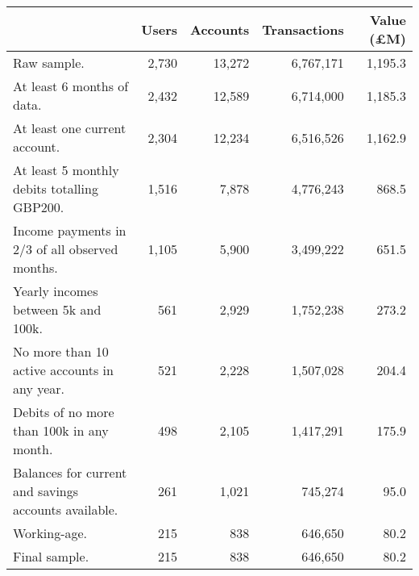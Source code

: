 \begin{tabular}{lrrrr}
\toprule
                                                     & Users & Accounts & Transactions & Value (\pounds M) \\
\midrule
                                         Raw sample. & 2,730 &   13,272 &    6,767,171 &           1,195.3 \\
                          At least 6 months of data. & 2,432 &   12,589 &    6,714,000 &           1,185.3 \\
                       At least one current account. & 2,304 &   12,234 &    6,516,526 &           1,162.9 \\
         At least 5 monthly debits totalling GBP200. & 1,516 &    7,878 &    4,776,243 &             868.5 \\
      Income payments in 2/3 of all observed months. & 1,105 &    5,900 &    3,499,222 &             651.5 \\
                 Yearly incomes between 5k and 100k. &   561 &    2,929 &    1,752,238 &             273.2 \\
        No more than 10 active accounts in any year. &   521 &    2,228 &    1,507,028 &             204.4 \\
           Debits of no more than 100k in any month. &   498 &    2,105 &    1,417,291 &             175.9 \\
Balances for current and savings accounts available. &   261 &    1,021 &      745,274 &              95.0 \\
                                        Working-age. &   215 &      838 &      646,650 &              80.2 \\
                                       Final sample. &   215 &      838 &      646,650 &              80.2 \\
\bottomrule
\end{tabular}
